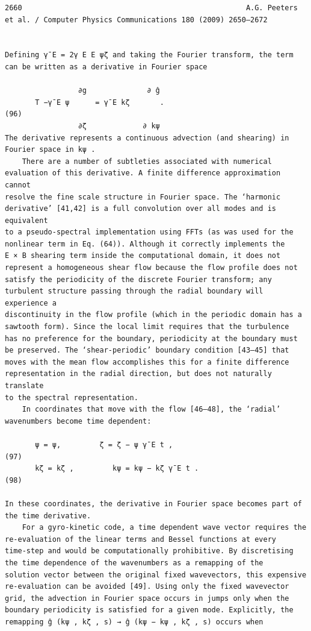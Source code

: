 \documentclass[a4paper]{article}
\newcommand{\gkwpagefont}{\fontsize{6.0pt}{7.55pt}\selectfont}
\begin{document}
\begin{Verbatim}[fontsize=\gkwpagefont]
2660                                                    A.G. Peeters et al. / Computer Physics Communications 180 (2009) 2650–2672


Defining γ̄ E = 2γ E E ψζ and taking the Fourier transform, the term can be written as a derivative in Fourier space
                   
                 ∂g              ∂ ĝ
       T −γ̄ E ψ      = γ̄ E kζ       .                                                                                                  (96)
                 ∂ζ             ∂ kψ
The derivative represents a continuous advection (and shearing) in Fourier space in kψ .
    There are a number of subtleties associated with numerical evaluation of this derivative. A finite difference approximation cannot
resolve the fine scale structure in Fourier space. The ‘harmonic derivative’ [41,42] is a full convolution over all modes and is equivalent
to a pseudo-spectral implementation using FFTs (as was used for the nonlinear term in Eq. (64)). Although it correctly implements the
E × B shearing term inside the computational domain, it does not represent a homogeneous shear flow because the flow profile does not
satisfy the periodicity of the discrete Fourier transform; any turbulent structure passing through the radial boundary will experience a
discontinuity in the flow profile (which in the periodic domain has a sawtooth form). Since the local limit requires that the turbulence
has no preference for the boundary, periodicity at the boundary must be preserved. The ‘shear-periodic’ boundary condition [43–45] that
moves with the mean flow accomplishes this for a finite difference representation in the radial direction, but does not naturally translate
to the spectral representation.
    In coordinates that move with the flow [46–48], the ‘radial’ wavenumbers become time dependent:

       ψ = ψ,         ζ = ζ − ψ γ̄ E t ,                                                                                                 (97)
       kζ = kζ ,         kψ = kψ − kζ γ̄ E t .                                                                                           (98)

In these coordinates, the derivative in Fourier space becomes part of the time derivative.
    For a gyro-kinetic code, a time dependent wave vector requires the re-evaluation of the linear terms and Bessel functions at every
time-step and would be computationally prohibitive. By discretising the time dependence of the wavenumbers as a remapping of the
solution vector between the original fixed wavevectors, this expensive re-evaluation can be avoided [49]. Using only the fixed wavevector
grid, the advection in Fourier space occurs in jumps only when the boundary periodicity is satisfied for a given mode. Explicitly, the
remapping ĝ (kψ , kζ , s) → ĝ (kψ − kψ , kζ , s) occurs when


\end{Verbatim}
\end{document}
